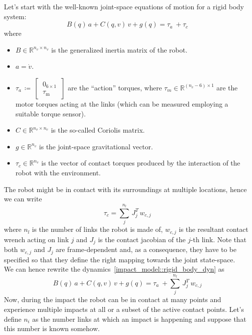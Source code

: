 \documentclass[letterpaper, 10 pt, conference]{ieeeconf}  %
\begin{document}
Let's start with the well-known joint-space equations of motion for a rigid body system: 
\begin{equation}\label{impact_model::rigid_body_dyn}
B(q)\,a +C(q, v)\,v + g(q) = \tau_{a}~ + \tau_{c}
\end{equation}
where
\begin{itemize}
\item $B\in\mathbb{R}^{n_v\times n_v}$ is the generalized inertia matrix of the robot.
\item $a=\dot{v}$.
\item $\tau_a\,\coloneqq\,\begin{bmatrix}
~0_{6\times 1}~\\
~\tau_{\mathrm{m}}~ 
\end{bmatrix}$ are the \enquote{action} torques, where $\tau_m\in \mathbb{R}^{\left(n_v - 6\right)\times 1}$ are the motor torques acting at the links (which can be measured employing a suitable torque sensor).
\item $C\in\mathbb{R}^{n_v\times n_v}$ is the so-called Coriolis matrix. 
\item $g\in \mathbb{R}^{n_v}$ is the joint-space gravitational vector.
\item $\tau_{c}\in \mathbb{R}^{n_v}$ is the vector of contact torques produced by the interaction of the robot with the environment. 
\end{itemize}
The robot might be in contact with its surroundings at multiple locations, hence we can write 
\begin{equation}
\tau_c = \sum_{j}^{n_l}\,J^{T}_{j}\,w_{c, j}
\end{equation}
where $n_l$ is the number of links the robot is made of, $w_{c, j}$ is the resultant contact wrench acting on link $j$ and $J_j$ is the contact jacobian of the $j$-th link. Note that both $w_{c, j}$ and $J_j$ are frame-dependent and, as a consequence, they have to be specified so that they define the right mapping towards the joint state-space.\\
We can hence rewrite the dynamics~\eqref{impact_model::rigid_body_dyn} as
\begin{equation}\label{impact_model::rigid_body_dyn_with_cont}
B(q)\,a +C(q, v)\,v + g(q) = \tau_{a}~ + \sum_{j}^{n_l}\,J^{T}_{j}\,w_{c, j}
\end{equation}
Now, during the impact the robot can be in contact at many points and experience multiple impacts at all or a subset of the active contact points. Let's define $n_i$ as the number links at which an impact is happening and suppose that this number is known somehow. 
\end{document}
